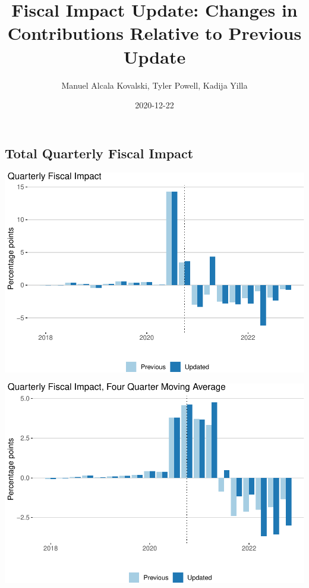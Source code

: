 \documentclass[
]{article}
\title{Fiscal Impact Update: Changes in Contributions Relative to
Previous Update}
\author{Manuel Alcala Kovalski, Tyler Powell, Kadija Yilla}
\date{2020-12-22}
\begin{document}
\maketitle

\hypertarget{total-quarterly-fiscal-impact}{%
\subsection{Total Quarterly Fiscal
Impact}\label{total-quarterly-fiscal-impact}}

\begin{center}\includegraphics{compare-update_files/figure-latex/fim-1} \end{center}

\begin{center}\includegraphics{compare-update_files/figure-latex/fim-ma-1} \end{center}
\end{document}

